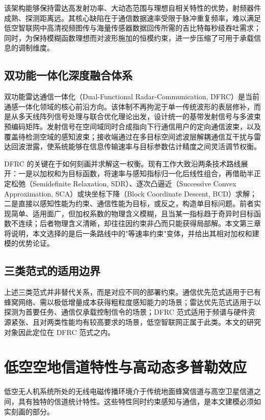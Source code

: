 该架构能够保持雷达高发射功率、大动态范围与理想自相关特性的优势，射频器件成熟、探测距离远。其核心缺陷在于通信数据速率受限于脉冲重复频率，难以满足低空智联网中高清视频图传与海量传感器数据回传所需的吉比特每秒级吞吐需求；同时，为保持模糊函数理想而对波形施加的恒模约束，进一步压缩了可用于承载信息的调制维度\cite{zhong2022constant}。

\subsection{双功能一体化深度融合体系}
双功能雷达通信一体化（Dual-Functional Radar-Communication, DFRC）是当前通感一体化领域的核心前沿方向。该体制不再拘泥于单一传统波形的表层修补，而是从多天线阵列信号处理与联合优化理论出发，设计统一的基带发射信号与多波束预编码矩阵。发射信号在空间域同时合成指向下行通信用户的定向通信波束，以及覆盖待检测空域的感知波束；接收端通过在多目标空间滤波层解耦通信互干扰与雷达回波泄露，使系统能够在信息传输速率与目标参数估计精度之间灵活调节权衡。

DFRC 的关键在于如何刻画并求解这一权衡。现有工作大致沿两条技术路线展开：一是以加权和为目标函数，将速率与感知指标归一化后线性组合，再借助半正定松弛（Semidefinite Relaxation, SDR）、逐次凸逼近（Successive Convex Approximation, SCA）或块坐标下降（Block Coordinate Descent, BCD）求解\cite{fu2024joint,zuo2025robust}；二是直接以感知性能为约束、通信性能为目标，或反之，构造单目标问题。前者实现简单、适用面广，但加权系数的物理含义模糊，且当某一指标趋于奇异时目标函数不连续；后者物理含义清晰，却往往因约束非凸而只能获得局部解。本文第三章将说明，本文选择的是后一条路线中的"等速率约束"变体，并给出其相对加权和建模的优势论证。

\subsection{三类范式的适用边界}
上述三类范式并非替代关系，而是对应不同的部署约束。通信优先范式适用于已有蜂窝网络、需以极低增量成本获得粗粒度感知能力的场景；雷达优先范式适用于以探测为首要任务、通信仅承载控制信令的场景；DFRC 范式适用于频谱与硬件资源紧张、且对两类性能均有较高要求的场景，低空智联网正属于此类。本文的研究对象因此定位在 DFRC 范式之内。

\section{低空空地信道特性与高动态多普勒效应}
低空无人机系统所处的无线电磁传播环境介于传统地面蜂窝信道与高空卫星信道之间，具有独特的信道统计特性。这些特性同时约束感知与通信，是本文建模必须如实刻画的部分。

